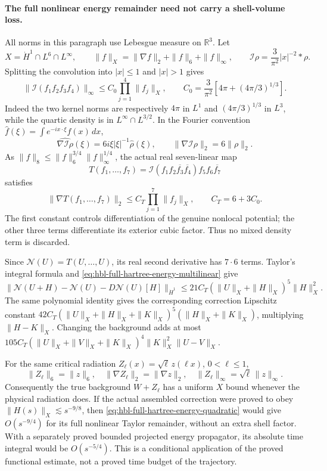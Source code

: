 \paragraph{The full nonlinear energy remainder need not carry a shell-volume loss.}
All norms in this paragraph use Lebesgue measure on \(\mathbb R^3\).
Let
\[
 X=\dot H^1\cap L^6\cap L^\infty,\qquad
 \|f\|_X=\|\nabla f\|_2+\|f\|_6+\|f\|_\infty,
 \qquad \mathcal I\rho=\frac3{\pi^2}|x|^{-2}*\rho.
\]
Splitting the convolution into \(|x|\le1\) and \(|x|>1\) gives
\[
 \|\mathcal I(f_1f_2f_3f_4)\|_\infty
 \le C_0\prod_{j=1}^4\|f_j\|_X,
 \qquad C_0=\frac3{\pi^2}\left[4\pi+(4\pi/3)^{1/3}\right].
\]
Indeed the two kernel norms are respectively \(4\pi\) in \(L^1\)
and \((4\pi/3)^{1/3}\) in \(L^3\), while the quartic density is
in \(L^\infty\cap L^{3/2}\).  In the Fourier convention
\(\widehat f(\xi)=\int e^{-ix\cdot\xi}f(x)\,dx\),
\[
 \widehat{\nabla\mathcal I\rho}(\xi)
   =6i\xi|\xi|^{-1}\widehat\rho(\xi),\qquad
 \|\nabla\mathcal I\rho\|_2=6\|\rho\|_2.
\]
As \(\|f\|_8\le\|f\|_6^{3/4}\|f\|_\infty^{1/4}\),
the actual real seven-linear map
\[
 T(f_1,\ldots,f_7)=
 \mathcal I(f_1f_2\overline{f_3}\overline{f_4})
 f_5f_6\overline{f_7}
\]
satisfies
\begin{equation}
 \|\nabla T(f_1,\ldots,f_7)\|_2
 \le C_T\prod_{j=1}^7\|f_j\|_X,
 \qquad C_T=6+3C_0.
 \label{eq:hbl-full-hartree-energy-multilinear}
\end{equation}
The first constant controls differentiation of the genuine nonlocal
potential; the other three terms differentiate its exterior cubic
factor.  Thus no mixed density term is discarded.

Since \(\mathcal N(U)=T(U,\ldots,U)\), its real second derivative
has \(7\cdot6\) terms. Taylor's integral formula and
\eqref{eq:hbl-full-hartree-energy-multilinear} give
\begin{equation}
 \|\mathcal N(U+H)-\mathcal N(U)-D\mathcal N(U)[H]\|_{\dot H^1}
 \le21C_T(\|U\|_X+\|H\|_X)^5\|H\|_X^2.
 \label{eq:hbl-full-hartree-energy-quadratic}
\end{equation}
The same polynomial identity gives the corresponding correction
Lipschitz constant
\(42C_T(\|U\|_X+\|H\|_X+\|K\|_X)^5
(\|H\|_X+\|K\|_X)\), multiplying \(\|H-K\|_X\).
Changing the background adds at most
\(105C_T(\|U\|_X+\|V\|_X+\|K\|_X)^4
\|K\|_X^2\|U-V\|_X\).

For the same critical radiation
\(Z_\ell(x)=\sqrt\ell\,z(\ell x)\), \(0<\ell\le1\),
\[
 \|Z_\ell\|_6=\|z\|_6,\quad
 \|\nabla Z_\ell\|_2=\|\nabla z\|_2,\quad
 \|Z_\ell\|_\infty=\sqrt\ell\,\|z\|_\infty.
\]
Consequently the true background \(W+Z_\ell\) has a uniform
\(X\) bound whenever the physical radiation does.  If the actual
assembled correction were proved to obey
\(\|H(s)\|_X\lesssim s^{-9/8}\), then
\eqref{eq:hbl-full-hartree-energy-quadratic} would give
\(O(s^{-9/4})\) for its full nonlinear Taylor remainder, without
an extra shell factor.  With a separately proved bounded projected
energy propagator, its absolute time integral would be
\(O(s^{-5/4})\).  This is a conditional application of the
proved functional estimate, not a proved time budget of the trajectory.

